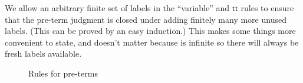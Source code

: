 \documentclass{book}
\def\finsubset{\subset_{\textrm{fin}}}
\let\types\vdash
\newcommand{\pc}{\mathrel{\mathord{:}?}}
\def\unit{\mathbf{1}}
\def\ttt{\mathsf{tt}}
\def\pair#1#2{\langle #1,#2\rangle}
\let\tensor\otimes
\begin{document}
We allow an arbitrary finite set of labels in the ``variable'' and $\ttt$ rules to ensure that the pre-term judgment is closed under adding finitely many more unused labels.
(This can be proved by an easy induction.)
This makes some things more convenient to state, and doesn't matter because \fA is infinite so there will always be fresh labels available.

\begin{figure}
  \centering
  \caption{Rules for pre-terms}
  \label{fig:pre-terms}
\end{figure}
\end{document}
